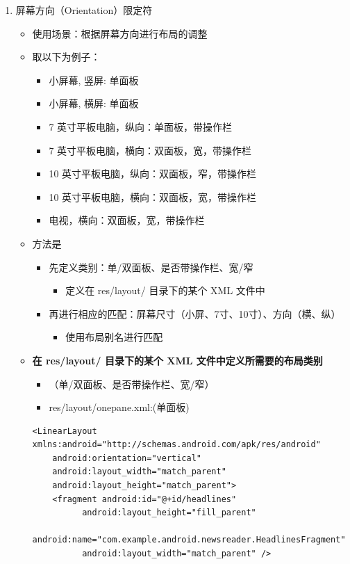 \documentclass[9pt, b5paper]{article}
\begin{document}
\begin{enumerate}
\begin{enumerate}
\begin{enumerate}
\item 屏幕方向（Orientation）限定符
\label{sec-1-6-1-1-2-4}
\begin{itemize}
\item 使用场景：根据屏幕方向进行布局的调整
\item 取以下为例子：
\begin{itemize}
\item 小屏幕, 竖屏: 单面板
\item 小屏幕, 横屏: 单面板
\item 7 英寸平板电脑，纵向：单面板，带操作栏
\item 7 英寸平板电脑，横向：双面板，宽，带操作栏
\item 10 英寸平板电脑，纵向：双面板，窄，带操作栏
\item 10 英寸平板电脑，横向：双面板，宽，带操作栏
\item 电视，横向：双面板，宽，带操作栏
\end{itemize}
\item 方法是
\begin{itemize}
\item 先定义类别：单/双面板、是否带操作栏、宽/窄
\begin{itemize}
\item 定义在 res/layout/ 目录下的某个 XML 文件中
\end{itemize}
\item 再进行相应的匹配：屏幕尺寸（小屏、7寸、10寸）、方向（横、纵）
\begin{itemize}
\item 使用布局别名进行匹配
\end{itemize}
\end{itemize}
\item \textbf{在 res/layout/ 目录下的某个 XML 文件中定义所需要的布局类别}
\begin{itemize}
\item （单/双面板、是否带操作栏、宽/窄）
\item res/layout/onepane.xml:(单面板)
\end{itemize}
\begin{verbatim}
<LinearLayout xmlns:android="http://schemas.android.com/apk/res/android"  
    android:orientation="vertical"  
    android:layout_width="match_parent"  
    android:layout_height="match_parent">  
    <fragment android:id="@+id/headlines"  
          android:layout_height="fill_parent"  
          android:name="com.example.android.newsreader.HeadlinesFragment"  
          android:layout_width="match_parent" />  

\end{verbatim}
\end{itemize}
\end{enumerate}
\end{enumerate}
\end{enumerate}
\end{document}
